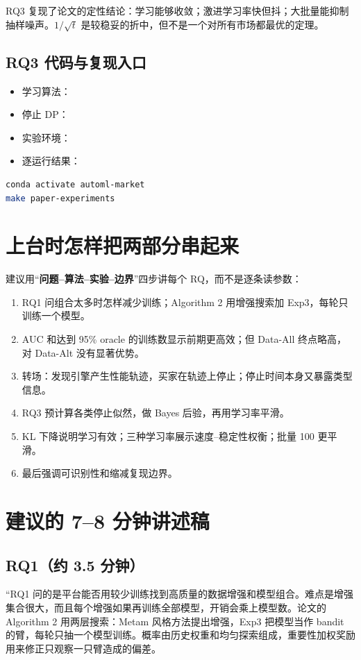 \documentclass[11pt,a4paper]{ctexart}
\newcommand{\key}[1]{\textcolor{ZJUBlue}{\textbf{#1}}}
\begin{document}
\begin{takeaway}
RQ3 复现了论文的定性结论：学习能够收敛；激进学习率快但抖；大批量能抑制抽样噪声。$1/\sqrt t$ 是较稳妥的折中，但不是一个对所有市场都最优的定理。
\end{takeaway}

\subsection{RQ3 代码与复现入口}
\begin{itemize}
  \item 学习算法：
  \item 停止 DP：
  \item 实验环境：
  \item 逐运行结果：
\end{itemize}
\begin{lstlisting}[language=bash]
conda activate automl-market
make paper-experiments
\end{lstlisting}

\section{上台时怎样把两部分串起来}
建议用“\key{问题--算法--实验--边界}”四步讲每个 RQ，而不是逐条读参数：
\begin{enumerate}
  \item RQ1 问组合太多时怎样减少训练；Algorithm 2 用增强搜索加 Exp3，每轮只训练一个模型。
  \item AUC 和达到 95\% oracle 的训练数显示前期更高效；但 Data-All 终点略高，对 Data-Alt 没有显著优势。
  \item 转场：发现引擎产生性能轨迹，买家在轨迹上停止；停止时间本身又暴露类型信息。
  \item RQ3 预计算各类停止似然，做 Bayes 后验，再用学习率平滑。
  \item KL 下降说明学习有效；三种学习率展示速度--稳定性权衡；批量 100 更平滑。
  \item 最后强调可识别性和缩减复现边界。
\end{enumerate}

\section{建议的 7--8 分钟讲述稿}
\subsection*{RQ1（约 3.5 分钟）}
“RQ1 问的是平台能否用较少训练找到高质量的数据增强和模型组合。难点是增强集合很大，而且每个增强如果再训练全部模型，开销会乘上模型数。论文的 Algorithm 2 用两层搜索：Metam 风格方法提出增强，Exp3 把模型当作 bandit 的臂，每轮只抽一个模型训练。概率由历史权重和均匀探索组成，重要性加权奖励用来修正只观察一只臂造成的偏差。
\end{document}

